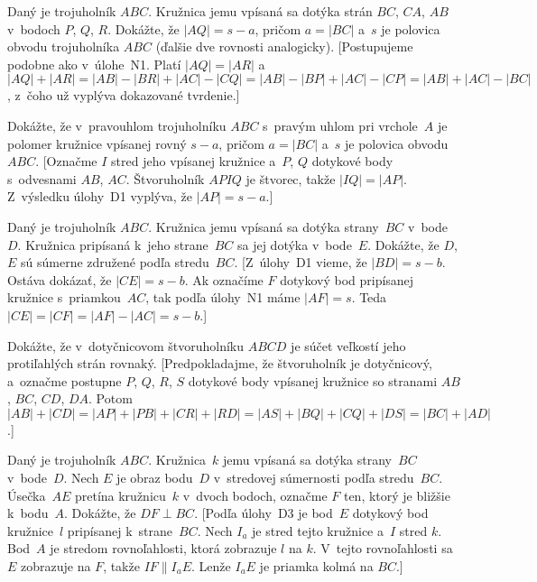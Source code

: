 {\D
Daný je trojuholník $ABC$. Kružnica jemu vpísaná sa
dotýka strán $BC$, $CA$, $AB$ v~bodoch $P$, $ Q$, $ R$. Dokážte, že
$|AQ|= s-a$, pričom $a=|BC|$ a~$s$ je polovica obvodu trojuholníka $ABC$
(ďalšie dve rovnosti analogicky).
[Postupujeme podobne ako v~úlohe~N1. Platí $|AQ|=|AR|$
a~$|AQ|+|AR|=|AB|-|BR|+|AC|-|CQ|=|AB|-|BP|+|AC|-|CP|=|AB|+|AC|-|BC|$,
z~čoho už vyplýva dokazované tvrdenie.]

Dokážte, že v~pravouhlom trojuholníku $ABC$ s~pravým
uhlom pri vrchole~$A$ je polomer kružnice vpísanej rovný $s-a$, pričom
$a=|BC|$ a~$s$ je polovica obvodu $ABC$. [Označme $I$ stred jeho vpísanej kružnice
a~$P$, $ Q$ dotykové body s~odvesnami $AB$, $AC$. Štvoruholník
$APIQ$ je štvorec, takže $|IQ|=|AP|$. Z~výsledku úlohy~D1 vyplýva, že
$|AP|= s-a$.]

Daný je trojuholník $ABC$. Kružnica jemu vpísaná sa
dotýka strany~$BC$ v~bode~$D$. Kružnica pripísaná k~jeho strane~$BC$ sa
jej dotýka v~bode~$E$. Dokážte, že $D$, $ E$ sú súmerne združené
podľa stredu~$BC$. [Z~úlohy~D1 vieme, že $|BD|= s-b$. Ostáva
dokázať, že $|CE|= s-b$. Ak označíme $F$ dotykový bod pripísanej
kružnice s~priamkou~$AC$, tak podľa úlohy~N1 máme $|AF|= s$.
Teda $|CE|=|CF|=|AF|-|AC|= s-b$.]

Dokážte, že v~dotyčnicovom štvoruholníku $ABCD$ je
súčet veľkostí jeho protiľahlých strán rovnaký.
[Predpokladajme, že štvoruholník je dotyčnicový, a~označme postupne
$P$, $Q$, $R$, $S$ dotykové body vpísanej kružnice
so stranami $AB$, $BC$, $CD$, $DA$. Potom
$|AB|+|CD|=|AP|+|PB|+|CR|+|RD|=|AS|+|BQ|+|CQ|+|DS|=|BC|+|AD|$.]

Daný je trojuholník $ABC$. Kružnica~$k$ jemu vpísaná
sa dotýka strany~$BC$ v~bode~$D$. Nech $E$ je obraz bodu~$D$
v~stredovej súmernosti podľa stredu~$BC$. Úsečka~$AE$ pretína
kružnicu~$k$ v~dvoch bodoch, označme $F$ ten, ktorý je bližšie
k~bodu~$A$. Dokážte, že $DF \perp BC$. [Podľa úlohy~D3 je bod~$E$
dotykový bod kružnice~$l$ pripísanej k~strane~$BC$. Nech $I_a$ je
stred tejto kružnice a~$I$ stred $k$. Bod~$A$ je stredom
rovnoľahlosti, ktorá zobrazuje $l$ na $k$. V~tejto rovnoľahlosti sa
$E$ zobrazuje na $F$, takže $IF \parallel I_aE$. Lenže $I_aE$ je
priamka kolmá na $BC$.]
}


